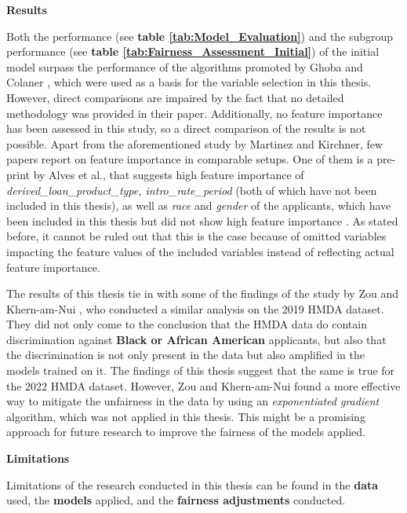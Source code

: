 


\textbf{Results}

Both the performance (see \textbf{table \ref{tab:Model_Evaluation}}) and the subgroup performance (see \textbf{table \ref{tab:Fairness_Assessment_Initial}}) of the initial model surpass the performance of the algorithms promoted by Ghoba and Colaner \parencite{Ghoba}, which were used as a basis for the variable selection in this thesis. However, direct comparisons are impaired by the fact that no detailed methodology was provided in their paper.
Additionally, no feature importance has been assessed in this study, so a direct comparison of the results is not possible. Apart from the aforementioned study by Martinez and Kirchner, few papers report on feature importance in comparable setups. 
One of them is a pre-print by Alves et al., that suggests high feature importance of \textit{derived\_loan\_product\_type, intro\_rate\_period} (both of which have not been included in this thesis), as well as \textit{race} and \textit{gender} of the applicants, which have been included in this thesis but did not show high feature importance \parencite{alves:hal-03033181}.
As stated before, it cannot be ruled out that this is the case because of omitted variables impacting the feature values of the included variables instead of reflecting actual feature importance.

The results of this thesis tie in with some of the findings of the study by Zou and Khern-am-Nui \parencite{Zou2023}, who conducted a similar analysis on the 2019 HMDA dataset.
They did not only come to the conclusion that the HMDA data do contain discrimination against \textbf{Black or African American} applicants, but also that the discrimination is not only present in the data but also amplified in the models trained on it. The findings of this thesis suggest that the same is true for the 2022 HMDA dataset.
However, Zou and Khern-am-Nui found a more effective way to mitigate the unfairness in the data by using an \textit{exponentiated gradient} algorithm, which was not applied in this thesis. This might be a promising approach for future research to improve the fairness of the models applied.




\textbf{Limitations}

Limitations of the research conducted in this thesis can be found in the \textbf{data} used, the \textbf{models} applied, and the \textbf{fairness adjustments} conducted.

